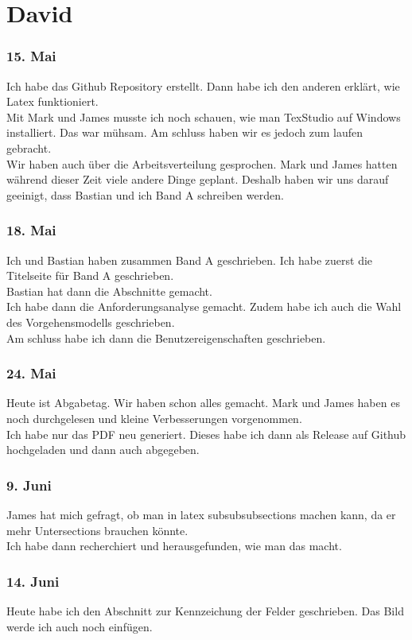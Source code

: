 \documentclass[10pt]{article}
\newcounter{subsubsubsection}[subsubsection]
\begin{document}
	\section{David}
	\subsubsection{15. Mai}
	Ich habe das Github Repository erstellt. Dann habe ich den anderen erklärt, wie Latex funktioniert.\\
	Mit Mark und James musste ich noch schauen, wie man TexStudio auf Windows installiert. Das war mühsam. Am schluss haben wir es jedoch zum laufen gebracht.\\
	Wir haben auch über die Arbeitsverteilung gesprochen. Mark und James hatten während dieser Zeit viele andere Dinge geplant. Deshalb haben wir uns darauf geeinigt, dass Bastian und ich Band A schreiben werden.\\
	\subsubsection{18. Mai}
	Ich und Bastian haben zusammen Band A geschrieben. Ich habe zuerst die Titelseite für Band A geschrieben.\\
	Bastian hat dann die Abschnitte gemacht.\\
	Ich habe dann die Anforderungsanalyse gemacht. Zudem habe ich auch die Wahl des Vorgehensmodells geschrieben.\\
	Am schluss habe ich dann die Benutzereigenschaften geschrieben.
	\subsubsection{24. Mai}
	Heute ist Abgabetag. Wir haben schon alles gemacht. Mark und James haben es noch durchgelesen und kleine Verbesserungen vorgenommen.\\
	Ich habe nur das PDF neu generiert. Dieses habe ich dann als Release auf Github hochgeladen und dann auch abgegeben.
	\subsubsection{9. Juni}
	James hat mich gefragt, ob man in latex subsubsubsections machen kann, da er mehr Untersections brauchen könnte.\\
	Ich habe dann recherchiert und herausgefunden, wie man das macht.
	\subsubsection{14. Juni}
	Heute habe ich den Abschnitt zur Kennzeichung der Felder geschrieben. Das Bild werde ich auch noch einfügen.\\
\end{document}
